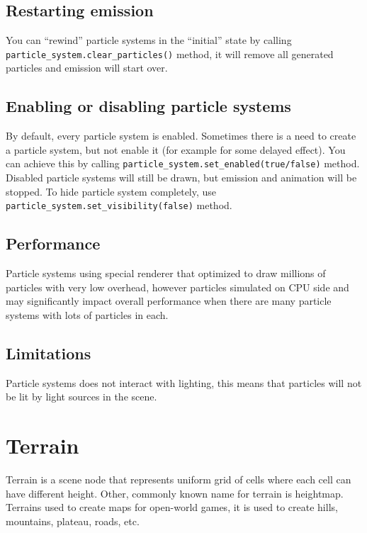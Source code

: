 \documentclass[
]{book}
\theoremstyle{definition}
\theoremstyle{definition}
\theoremstyle{definition}
\theoremstyle{definition}
\theoremstyle{remark}
\begin{document}
\subsection{Restarting emission}\label{restarting-emission}

You can ``rewind'' particle systems in the ``initial'' state by calling \texttt{particle\_system.clear\_particles()} method, it will remove all generated particles and emission will start over.

\subsection{Enabling or disabling particle systems}\label{enabling-or-disabling-particle-systems}

By default, every particle system is enabled. Sometimes there is a need to create a particle system, but not enable it (for example for some delayed effect). You can achieve this by calling \texttt{particle\_system.set\_enabled(true/false)} method. Disabled particle systems will still be drawn, but emission and animation will be stopped. To hide particle system completely, use \texttt{particle\_system.set\_visibility(false)} method.

\subsection{Performance}\label{performance-3}

Particle systems using special renderer that optimized to draw millions of particles with very low overhead, however particles simulated on CPU side and may significantly impact overall performance when there are many particle systems with lots of particles in each.

\subsection{Limitations}\label{limitations}

Particle systems does not interact with lighting, this means that particles will not be lit by light sources in the scene.

\section{Terrain}\label{terrain}

Terrain is a scene node that represents uniform grid of cells where each cell can have different height. Other, commonly known name for terrain is heightmap. Terrains used to create maps for open-world games, it is used to create hills, mountains, plateau, roads, etc.
\end{document}
